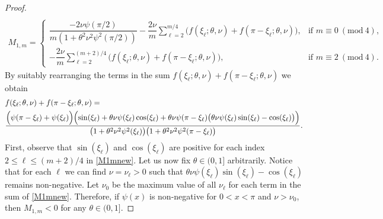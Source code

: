 \documentclass[a4paper]{article}
\newcommand{\Mod}[1]{\ (\mathrm{mod}\ #1)}
\begin{document}
\begin{description}[style=unboxed,leftmargin=0cm]
\begin{proof}
\begin{align}
		\end{align}
	\else
		\begin{align}\label{M1mnew}
			M_{1,m} = \begin{cases}
								\dfrac{-2\nu\psi(\pi/2)}{m\left(1+\theta^2\nu^2\psi^2(\pi/2)\right)} -
									\dfrac{2\nu}{m} \displaystyle{\sum\limits_{\ell=2}^{m/4}}
									\Big(f(\xi_\ell; \theta, \nu) + f(\pi-\xi_\ell; \theta, \nu) \Big),
									& \text{if } m \equiv 0 \Mod{4}, \\[20pt]
								-\dfrac{2\nu}{m} \displaystyle{\sum\limits_{\ell=2}^{(m+2)/4}}
									\Big(f(\xi_\ell; \theta, \nu) + f(\pi-\xi_\ell; \theta, \nu)\Big),
									& \text{if } m \equiv 2 \Mod{4}.
							\end{cases}
		\end{align}
	\fi
	By suitably rearranging the terms in the sum $f(\xi_\ell; \theta, \nu) + f(\pi-\xi_\ell; \theta, \nu)$ we obtain
	\begin{align*}
		&f(\xi_\ell; \theta, \nu) + f(\pi-\xi_\ell; \theta, \nu) = \\
			&\frac{\Bigl(\psi(\pi-\xi_\ell) + \psi(\xi_\ell)\Bigr)
			\Bigl(\sin(\xi_\ell) + \theta\nu\psi(\xi_\ell)\cos(\xi_\ell) +
			\theta\nu\psi(\pi-\xi_\ell)\bigl(\theta\nu\psi(\xi_\ell)\sin(\xi_\ell)-\cos(\xi_\ell)\bigr)\Bigr)}
				{\bigl(1+\theta^2\nu^2\psi^2(\xi_\ell)\bigr)\bigl(1+\theta^2\nu^2\psi^2(\pi-\xi_\ell)\bigr)}.
	\end{align*}
	First, observe that $\sin(\xi_\ell)$ and $\cos(\xi_\ell)$ are positive for each index $2 \le \ell \le (m+2)/4$ in
	\eqref{M1mnew}.
	Let us now fix $\theta \in (0,1]$ arbitrarily.
	Notice that for each $\ell$ we can find $\nu = \nu_\ell > 0$ such that
	$\theta\nu\psi(\xi_\ell)\sin(\xi_\ell)-\cos(\xi_\ell)$ remains non-negative.
	Let $\nu_0$ be the maximum value of all $\nu_\ell$ for each term in the sum of \eqref{M1mnew}.
	Therefore, if $\psi(x)$ is non-negative for $0< x <\pi$ and $\nu > \nu_0$, then $M_{1,m} < 0$ for any
	$\theta \in (0,1]$.


\end{proof}
\end{description}
\end{document}
